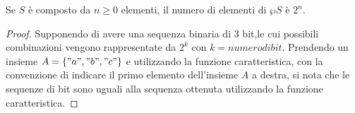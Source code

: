 \begin{defi}
Se $S$ è composto da $n \geq 0$ elementi, il numero di elementi di $\wp S$ è $2 ^ n$.
\end{defi}
\begin{proof}
Supponendo di avere una sequenza binaria di 3 bit,le cui possibili combinazioni
vengono rappresentate da $2 ^ k$ con $k = numero di bit$.\newline
Prendendo un insieme $A = \{"a","b","c" \}$ e utilizzando la funzione caratteristica,
con la convenzione di indicare il primo elemento dell'insieme $A$ a destra, si nota
che le sequenze di bit sono uguali alla sequenza ottenuta utilizzando la funzione caratteristica.
\end{proof}


